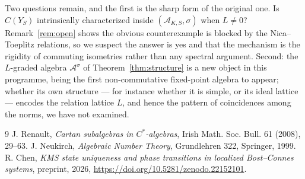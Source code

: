 \documentclass[11pt]{amsart}
\numberwithin{equation}{section}
\theoremstyle{definition}
\theoremstyle{remark}
\newcommand{\cA}{\mathcal{A}}
\begin{document}
Two questions remain, and the first is the sharp form of the original one. Is $C(Y_S)$
intrinsically characterized inside $(\cA_{K,S},\sigma)$ when $L\ne0$? Remark~\ref{rem:open}
shows the obvious counterexample is blocked by the Nica--Toeplitz relations, so we suspect
the answer is yes and that the mechanism is the rigidity of commuting isometries rather than
any spectral argument. Second: the $L$-graded algebra $\cA^\sigma$ of
Theorem~\ref{thm:structure} is a new object in this programme, being the first non-commutative
fixed-point algebra to appear; whether its own structure --- for instance whether it is
simple, or its ideal lattice --- encodes the relation lattice $L$, and hence the pattern of
coincidences among the norms, we have not examined.

\begin{thebibliography}{9}
 J. Renault, \emph{Cartan subalgebras in $C^*$-algebras}, Irish Math. Soc. Bull. 61 (2008), 29--63.
 J. Neukirch, \emph{Algebraic Number Theory}, Grundlehren 322, Springer, 1999.
 R. Chen, \emph{KMS state uniqueness and phase transitions in localized Bost--Connes systems}, preprint, 2026, \newline\url{https://doi.org/10.5281/zenodo.22152101}.
\end{thebibliography}
\end{document}
